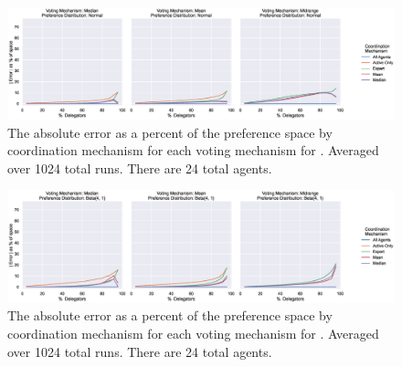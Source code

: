 \begin{landscape}
    \begin{figure}[p]
        \centering
        \includegraphics[scale=0.55]
        {content/chapter2/figures/distributions/Normal_error_as_percent_of_space_abs_mean}
        \caption{
            The absolute error as a percent of the preference space by coordination
            mechanism for each voting mechanism for \gaussiandist.
            Averaged over 1024 total runs.
            There are 24 total agents.
        }
        \label{fig:normal-error-as-percent-of-space-abs-mean}
    \end{figure}
\end{landscape}

\begin{landscape}
    \begin{figure}[p]
        \centering
        \includegraphics[scale=0.55]
        {content/chapter2/figures/distributions/Beta_4_1_error_as_percent_of_space_abs_mean}
        \caption{
            The absolute error as a percent of the preference space by coordination
            mechanism for each voting mechanism for .
            Averaged over 1024 total runs.
            There are 24 total agents.
        }
        \label{fig:beta-4-1-error-as-percent-of-space-abs-mean}
    \end{figure}
\end{landscape}

